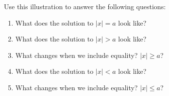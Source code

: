 \documentclass{ximera}
\begin{document}
Use this illustration to answer the following questions:

\begin{enumerate}
 \item What does the solution to $|x| = a$ look like?
 \item What does the solution to $|x| > a$ look like?
 \item What changes when we include equality? $|x| \geq a$?
 \item What does the solution to $|x| < a$ look like?
 \item What changes when we include equality? $|x| \leq a$?
\end{enumerate}

\begin{center}
\end{center}
\end{document}
